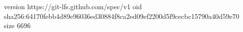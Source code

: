 version https://git-lfs.github.com/spec/v1
oid sha256:64170febb4d89e96036ed30884f8ca2ed09ef2200d5f9cecbc15790a40d59e70
size 6696
